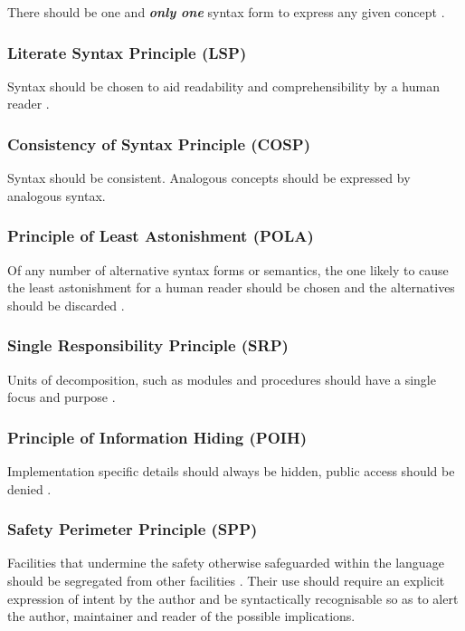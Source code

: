 \documentclass[10pt,a4paper]{article}
\renewcommand{\emph}[1]{\textbf{\textit{#1}}}
\begin{document}
There should be one and \emph{only one} syntax form to express any given
concept \cite{Dijkstra78}.

\subsubsection{Literate Syntax Principle (LSP)}
\label{LSP}

Syntax should be chosen to aid readability and comprehensibility by a human
reader \cite{Knuth84}.

\subsubsection{Consistency of Syntax Principle (COSP)}
\label{COSP}

Syntax should be consistent. Analogous concepts should be expressed by
analogous syntax.

\subsubsection{Principle of Least Astonishment (POLA)}
\label{POLA}

Of any number of alternative syntax forms or semantics, the one likely to cause
the least astonishment for a human reader should be chosen and the alternatives
should be discarded \cite{Geoffrey87}.

\subsubsection{Single Responsibility Principle (SRP)}
\label{SRP}

Units of decomposition, such as modules and procedures should have a single
focus and purpose \cite{Martin09}.

\subsubsection{Principle of Information Hiding (POIH)}
\label{POIH}

Implementation specific details should always be hidden, public access should
be denied \cite{Parnas72}.

\subsubsection{Safety Perimeter Principle (SPP)}
\label{SPP}

Facilities that undermine the safety otherwise safeguarded within the language
should be segregated from other facilities \cite[chapter~29]{Wirth88}. Their
use should require an explicit expression of intent by the author and be
syntactically recognisable so as to alert the author, maintainer and reader
of the possible implications.
\end{document}
